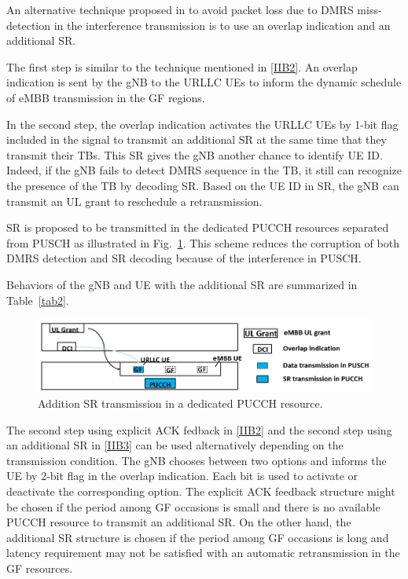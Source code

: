\documentclass{ieeeaccess}
\begin{document}
An alternative technique proposed in \cite{ad99} to avoid packet loss due to DMRS miss-detection in the interference transmission is to use an overlap indication and an additional SR.

The first step is similar to the technique mentioned in \ref{IIB2}. An overlap indication is sent by the gNB to the URLLC UEs to inform the dynamic schedule of eMBB transmission in the GF regions.

In the second step, the overlap indication activates the URLLC UEs by 1-bit flag included in the signal to transmit an additional SR at the same time that they transmit their TBs. This SR gives the gNB another chance to identify UE ID. Indeed, if the gNB fails to detect DMRS sequence in the TB, it still can recognize the presence of the TB by decoding SR. Based on the UE ID in SR, the gNB can transmit an UL grant to reschedule a retransmission.

SR is proposed to be transmitted in the dedicated PUCCH resources separated from PUSCH as illustrated in Fig.~\ref{fig3}. This scheme reduces the corruption of both DMRS detection and SR decoding because of the interference in PUSCH.

Behaviors of the gNB and UE with the additional SR are summarized in Table~\ref{tab2}.

\begin{figure}[htbp]
\centerline{\includegraphics[scale=0.33]{fig3.PNG}}
\caption{Addition SR transmission in a dedicated PUCCH resource.}
\label{fig3}
\vspace{-2mm}
\end{figure}


The second step using explicit ACK fedback in \ref{IIB2} and the second step using an additional SR in \ref{IIB3} can be used alternatively depending on the transmission condition. The gNB chooses between two options and informs the UE by 2-bit flag in the overlap indication. Each bit is used to activate or deactivate the corresponding option. The explicit ACK feedback structure might be chosen if the period among GF occasions is small and there is no available PUCCH resource to transmit an additional SR. On the other hand, the additional SR structure is chosen if the period among GF occasions is long and latency requirement may not be satisfied with an automatic retransmission in the GF resources. 
\end{document}
